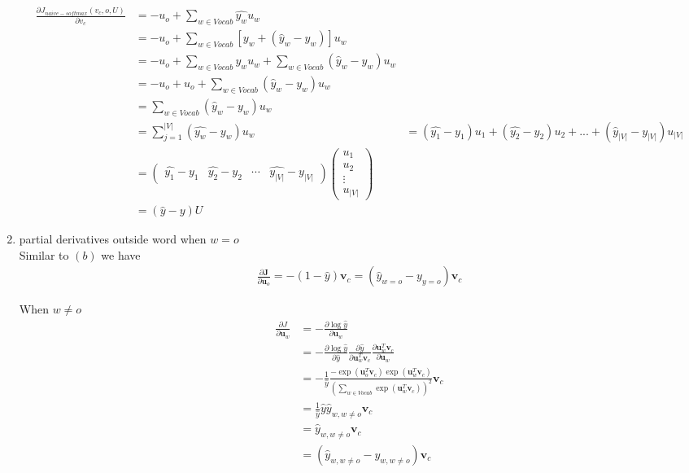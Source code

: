 \documentclass{article}
\begin{document}
\begin{enumerate}[label=(\alph*)]
	\begin{align}
	\frac{\partial J_{naive-softmax}(v_c,o,U)}{\partial{v_{c}}} &=-u_{o}+\sum_{w\in Vocab}\hat{y_{w}}u_{w} \\
	 &=-u_{o}+\sum_{w\in Vocab}[ y_{w}+(\hat{y}_{w}-y_{w}) ]u_{w} \\
	 &=-u_{o}+\sum_{w\in Vocab}y_{w}u_{w} + \sum_{w\in Vocab}(\hat{y}_{w}-y_{w})u_{w} \\
	 &=-u_{o}+u_{o}+\sum_{w\in Vocab}(\hat{y}_{w}-y_{w})u_{w} \\
	 &=\sum_{w\in Vocab}(\hat{y}_{w}-y_{w})u_{w} \\
	 &=\sum_{j=1}^{|V|}(\hat{y_{w}}-y_{w})u_{w} &=(\hat{y_{1}}-y_{1})u_{1}+(\hat{y_{2}}-y_{2})u_{2}+...+(\hat{y}_{|V|}-y_{|V|})u_{|V|} \\ 
	 &= \left ( \begin{matrix} \hat{y_{1}}-y_{1} & \hat{y_{2}}-y_{2} & \cdots & \hat{y_{|V|}}-y_{|V|}\end{matrix} \right ) \left ( \begin{matrix} u_{1} \\ u_{2} \\ \vdots \\ u_{|V|} \end{matrix} \right ) \\
	 &=(\hat y-y)U 
	\end{align}
	
	\item partial derivatives outside word when $w=o$ \\
	Similar to $(b)$ we have
	\begin{align}
	\frac{\partial \bm{J}}{\partial \bm{u}_{o}} = - (1- \hat{y}) \bm{v}_{c} = (\hat{y}_{w=o} - y_{y=o})\bm{v}_{c}
	\end{align}
	
	When $w\neq o$
	\begin{align}
	\frac{\partial J}{\partial \bm{u}_{w}} &= - \frac{\partial \log \hat{y}}{\partial \bm{u}_{w}} \\
	&= - \frac{\partial \log \hat{y}}{\partial \hat{y}} \frac{\partial \hat{y}}{\partial \bm{u}_{w}^{T} \bm{v}_{c}} \frac{\partial \bm{u}_{w}^{T} \bm{v}_{c}}{\partial \bm{u}_{w}} \\
	&= - \frac{1}{\hat{y}} \frac{-\exp (\bm{u}_{o}^{T} \bm{v}_{c}) \exp (\bm{u}_{w}^{T} \bm{v}_{c})}{\left(\sum_{w \in Vocab} \exp (\bm{u}_{w}^{T} \bm{v}_{c})\right)^{2}} \bm{v}_{c} \\
	&= \frac{1}{\hat{y}} \hat{y} \hat{y}_{w, w\neq o} \bm{v}_{c} \\
	&= \hat{y}_{w, w\neq o} \bm{v}_{c} \\
	&= (\hat{y}_{w, w\neq o}-y_{w, w\neq o}) \bm{v}_{c}
	\end{align}
	

\end{enumerate}
\end{document}
